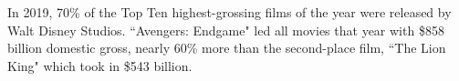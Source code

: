\documentclass{article}
\begin{document}
In 2019, 70\% of the Top Ten highest-grossing films of the year were released by Walt Disney Studios.
``Avengers: Endgame" led all movies that year with \$858 billion domestic gross, nearly 60\% more than the second-place film, ``The Lion King" which took in \$543 billion.
\end{document}
